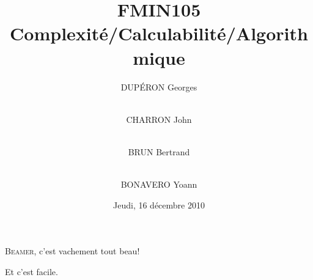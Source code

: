 \documentclass{beamer}
\title{FMIN105 \\ Complexité/Calculabilité/Algorithmique}
\author{DUPÉRON Georges \and\\ CHARRON John \and\\ BRUN Bertrand \and\\ BONAVERO Yoann}
\institute{Université Montpellier II, Département informatique}
\date{Jeudi, 16 décembre 2010}
\begin{document}
\begin{frame}
  \titlepage
\end{frame}

\begin{frame}
  \textsc{Beamer}, c'est vachement tout beau!
\end{frame}

\begin{frame}
  Et c'est facile.
\end{frame}


\end{document}

